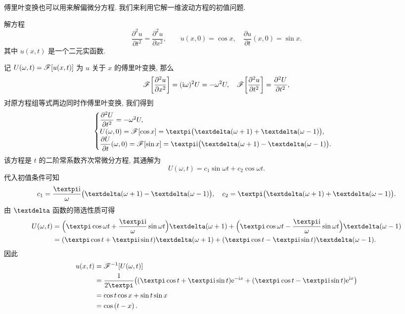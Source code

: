 傅里叶变换也可以用来解偏微分方程.
我们来利用它解一维波动方程的初值问题.

\begin{example}
  解方程
  \[
     \dfrac{\partial^2 u}{\partial t^2}
    =\dfrac{\partial^2u}{\partial x^2},\qquad
     u(x,0)=\cos x,\quad
     \dfrac{\partial u}{\partial t}(x,0)=\sin x.
  \]
  其中 $u(x,t)$ 是一个二元实函数.
\end{example}

\begin{solution}
  记 $U(\omega,t)=\mathscr{F}[u(x,t)]$ 为 $u$ 关于 $x$ 的傅里叶变换, 那么
  \[
    \mathscr{F}\biggl[\frac{\partial^2u}{\partial x^2}\biggr]
   =(\mathrm{i}\omega)^2 U
   =-\omega^2 U,\quad
    \mathscr{F}\biggl[\frac{\partial^2u}{\partial t^2}\biggr]
   =\frac{\partial^2 U}{\partial t^2},
  \]
  对原方程组等式两边同时作傅里叶变换, 我们得到
  \[\begin{cases}
     \dfrac{\partial^2 U}{\partial t^2}
    =-\omega^2 U,\\
     U(\omega,0)
    =\msf[\cos x]
    =\cpi\bigl(\dirac(\omega+1)+\dirac(\omega-1)\bigr),\\
     \dfrac{\partial U}{\partial t}(\omega,0)
    =\msf[\sin x]
    =\cpi\ii\bigl(\dirac(\omega+1)-\dirac(\omega-1)\bigr).
  \end{cases}\]
  该方程是 $t$ 的二阶常系数齐次常微分方程, 其通解为
  \[
    U(\omega,t)=c_1\sin\omega t+c_{2}\cos\omega t.
  \]
  代入初值条件可知
  \[
     c_1
    =\frac{\cpi\ii}{\omega}\bigl(\dirac(\omega+1)-\dirac(\omega-1)\bigr),\quad
     c_2
    =\cpi\bigl(\dirac(\omega+1)+\dirac(\omega-1)\bigr).
  \]
  由 $\dirac$ 函数的筛选性质可得
  \begin{align*}
     U(\omega,t)&
    =\Bigl(\cpi\cos\omega t+\frac{\cpi\ii}\omega\sin\omega t\Bigr)\dirac(\omega+1)
    +\Bigl(\cpi\cos\omega t-\frac{\cpi\ii}\omega\sin\omega t\Bigr)\dirac(\omega-1)\\&
    =(\cpi\cos t+\cpi\ii\sin t)\dirac(\omega+1)
    +(\cpi\cos t-\cpi\ii\sin t)\dirac(\omega-1).
  \end{align*}
  因此
  \begin{align*}
     u(x,t)&
    =\msf^{-1}[U(\omega,t)]\\&
    =\frac1{2\cpi}\bigl(
       (\cpi\cos t+\cpi\ii\sin t)\ee^{-\ii x}
      +(\cpi\cos t-\cpi\ii\sin t)\ee^{\ii x}
    \bigr)\\&
    =\cos t\cos x+\sin t\sin x\\&
    =\cos\left(t-x\right).
  \end{align*}
\end{solution}

